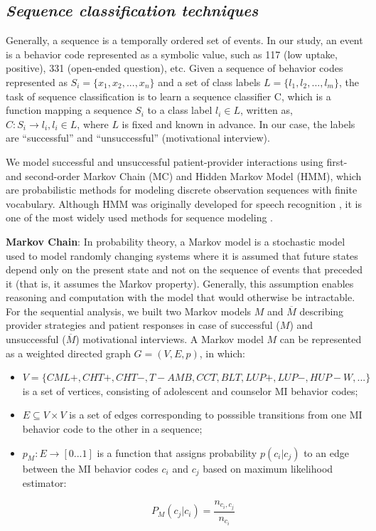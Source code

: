 \documentclass{amia}
\begin{document}
\subsection*{\textit{Sequence classification techniques}}

Generally, a sequence is a temporally ordered set of events. In our study, an event is a behavior code represented as a symbolic value, such as 117 (low uptake, positive), 331 (open-ended question), etc.  Given a sequence of behavior codes represented as $S_i = \{x_1, x_2,...,x_n\}$ and a set of class labels $L = \{l_1, l_2,...,l_m\}$, the task of sequence classification is to learn a sequence classifier C, which is a function mapping a sequence $S_i$ to a class label $l_i \in L$, written as, $C : S_i \to l_i, l_i \in L$, where $L$ is fixed and known in advance. In our case, the labels are ``successful'' and ``unsuccessful'' (motivational interview).

We model successful and unsuccessful patient-provider interactions using first- and second-order Markov Chain (MC) and Hidden Markov Model (HMM), which are probabilistic methods for modeling discrete observation sequences with finite vocabulary. Although HMM was originally developed for speech recognition \cite{rabiner1989tutorial}, it is one of the most widely used methods for sequence modeling \cite{mutsam2016maximum, eickeler1998hidden, srivastava2007hmm, won2004training, chai2001folk}.

\textbf {Markov Chain}: In probability theory, a Markov model \cite{} is a stochastic model used to model randomly changing systems where it is assumed that future states depend only on the present state and not on the sequence of events that preceded it (that is, it assumes the Markov property). Generally, this assumption enables reasoning and computation with the model that would otherwise be intractable. For the sequential analysis, we built two Markov models $M$ and $\overline{M}$ describing provider strategies and patient responses in case of successful ($M$) and unsuccessful ($\overline{M}$) motivational interviews. A Markov model $M$ can be represented as a weighted directed graph $G = (V, E, p)$, in which:

\begin{itemize}
\item $V = \{CML+, CHT+, CHT-, T-AMB, CCT, BLT, LUP+, LUP-, HUP-W, ...\}$ is a set of vertices, consisting of adolescent and counselor MI behavior codes;
\item $E \subseteq V \times V$ is a set of edges corresponding to posssible transitions from one MI behavior code to the other in a sequence;
\item $p_M:E\rightarrow[0...1]$ is a function that assigns probability $p(c_i|c_j)$ to an edge between the MI behavior codes $c_i$ and $c_j$ based on maximum likelihood estimator:

\begin{equation}
P_M(c_j|c_i) = \frac{n_{c_i,c_j}}{n_{c_i}}
\end{equation}

\end{itemize}
\end{document}
